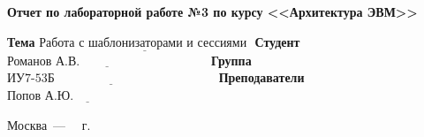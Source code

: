 \documentclass[a4paper,14pt, unknownkeysallowed]{extreport}
\begin{document}
\begin{titlepage}
\begin{center}
    \Large\textbf{Отчет по лабораторной работе №3 по курсу <<Архитектура ЭВМ>>}\newline
\end{center}

\noindent\textbf{Тема} $\underline{\text{Работа с шаблонизаторами и сессиями~}}$\newline\newline
\noindent\textbf{Студент} $\underline{\text{Романов А.В.~~~~~~~~~~~~~~~~~~~~~~~~~~~~~~~}}$\newline\newline
\noindent\textbf{Группа} $\underline{\text{ИУ7-53Б~~~~~~~~~~~~~~~~~~~~~~~~~~~~~~~~~~~~~~~}}$\newline\newline
\noindent\textbf{Преподаватели} $\underline{\text{Попов А.Ю.~~~~~~~~~~~~~~~~~~~~~~~}}$\newline

\begin{center}
    \vfill
    Москва~---~\the\year
    ~г.
\end{center}
\restoregeometry
\end{titlepage}
\end{document}
